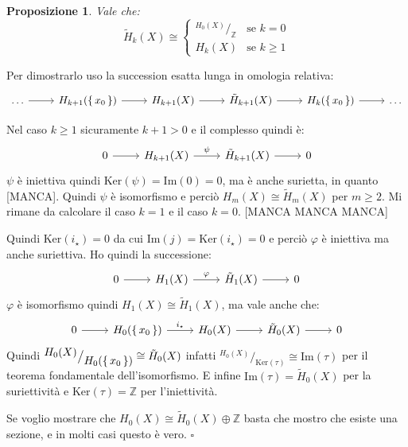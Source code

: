 \documentclass[10pt, twoside=false, x11names]{scrbook}
\newtheorem{proposition}[theorem]{Proposizione}
\newenvironment{proof}{{\textbf{Dimostrazione}:}}{\hfill $\square$}
\newcommand{\Z}{\mathbb{Z}}
\newcommand{\im}[1]{\mathrm{Im}( #1 )}
\renewcommand{\ker}[1]{\mathrm{Ker}( #1)}
\renewcommand{\phi}{\varphi}
\newcommand*\quot[2]{{^{\textstyle #1}\big/_{\textstyle #2}}}
\begin{document}
\begin{proposition}
  Vale che:
  \[
    \tilde{H}_k(X) \cong
    \begin{cases}
      \quot{H_0(X)}{\Z} & \text{se } k = 0 \\
      H_k(X) & \text{se } k \geq 1
    \end{cases}
  \]
\end{proposition}
\begin{proof}
  Per dimostrarlo uso la succession esatta lunga in omologia relativa:
  \[
    \begin{tikzcd}
      \dots \arrow{r}{} & H_{k+1}(\set{x_0}) \arrow{r}{} & H_{k+1}(X) \arrow{r}{} & \tilde{H}_{k+1}(X) \arrow{r}{} & H_k(\set{x_0}) \arrow{r}{} & \dots
    \end{tikzcd}
  \]

  Nel caso $ k \geq 1 $ sicuramente $ k + 1 > 0 $ e il complesso quindi è:
  \[
    \begin{tikzcd}
      0 \arrow{r}{}  & H_{k+1}(X) \arrow{r}{\psi} &  \tilde{H}_{k+1}(X) \arrow{r}{} &  0
    \end{tikzcd}
  \]
  $ \psi $ è iniettiva quindi $ \ker{\psi} = \im{0} = 0 $, ma è anche surietta, in quanto [MANCA].
  Quindi $ \psi $ è isomorfismo e perciò $ H_m(X) \cong \tilde{H}_m(X) $ per $ m \geq 2 $.
  Mi rimane da calcolare il caso $ k = 1 $ e il caso $ k = 0 $.
  [MANCA MANCA MANCA]


  Quindi $ \ker{i_\star} = 0 $ da cui $ \im{j} = \ker{i_\star} = 0 $ e perciò $ \phi $ è iniettiva ma anche
  suriettiva. Ho quindi la successione:
  \[
    \begin{tikzcd}
       0 \arrow{r}{}  & H_1(X) \arrow{r}{\phi} &  \tilde{H}_1(X) \arrow{r}{} & 0
    \end{tikzcd}
  \]
  $ \phi $ è isomorfismo quindi $ H_1(X) \cong \tilde{H}_1(X) $, ma vale anche che:
  \[
    \begin{tikzcd}
       0 \arrow{r}{}  & H_0(\set{x_0}) \arrow{r}{i_\star} &  H_0(X) \arrow{r}{} & \tilde{H}_0(X) \arrow{r}{} & 0
    \end{tikzcd}
  \]
  Quindi $ \quot{H_0(X)}{H_0(\set{x_0})} \cong \tilde{H}_0(X) $ infatti $ \quot{H_0(X)}{\ker{\tau}} \cong \im{\tau} $
  per il teorema fondamentale dell'isomorfismo. E infine $ \im{\tau} = \tilde{H}_0(X) $ per la suriettività
  e $ \ker{\tau} = \Z $ per l'iniettività.

  Se voglio mostrare che $ H_0(X) \cong \tilde{H}_0(X) \oplus \Z $ basta che mostro che esiste una sezione, e in
  molti casi questo è vero.
\end{proof}
\end{document}
